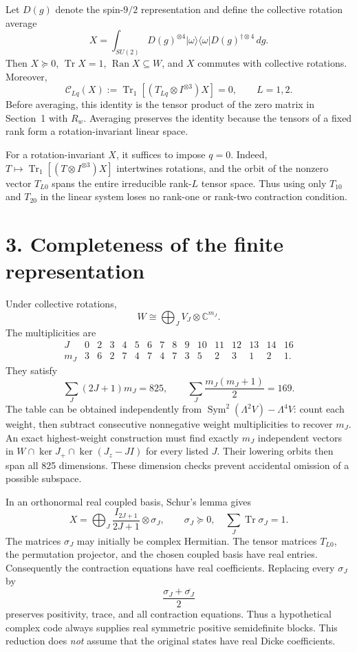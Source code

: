 \documentclass[11pt]{article}
\newcommand{\Tr}{\operatorname{Tr}}
\newcommand{\Sym}{\operatorname{Sym}}
\newcommand{\Ran}{\operatorname{Ran}}
\begin{document}
Let $D(g)$ denote the spin-$9/2$ representation and define the collective rotation average
\[
 X=\int_{SU(2)}D(g)^{\otimes4}|\omega\rangle\langle\omega|
                      D(g)^{\dagger\otimes4}\,dg.
\]
Then $X\succeq0$, $\Tr X=1$, $\Ran X\subseteq W$, and $X$ commutes with collective rotations. Moreover,
\[
 \mathcal C_{Lq}(X):=
 \Tr_1[(T_{Lq}\otimes I^{\otimes3})X]=0,
 \qquad L=1,2.
\]
Before averaging, this identity is the tensor product of the zero matrix in Section~1 with $R_w$. Averaging preserves the identity because the tensors of a fixed rank form a rotation-invariant linear space.

For a rotation-invariant $X$, it suffices to impose $q=0$. Indeed,
$T\mapsto\Tr_1[(T\otimes I^{\otimes3})X]$ intertwines rotations, and the orbit of the nonzero vector $T_{L0}$ spans the entire irreducible rank-$L$ tensor space. Thus using only $T_{10}$ and $T_{20}$ in the linear system loses no rank-one or rank-two contraction condition.

\section*{3. Completeness of the finite representation}
Under collective rotations,
\[
 W\cong\bigoplus_J V_J\otimes\mathbb C^{m_J}.
\]
The multiplicities are
\[
\begin{array}{c|rrrrrrrrrrrrrrr}
J&0&2&3&4&5&6&7&8&9&10&11&12&13&14&16\\\hline
m_J&3&6&2&7&4&7&4&7&3&5&2&3&1&2&1.
\end{array}
\]
They satisfy
\[
 \sum_J(2J+1)m_J=825,
 \qquad \sum_J\frac{m_J(m_J+1)}2=169.
\]
The table can be obtained independently from
$\Sym^2(\Lambda^2V)-\Lambda^4V$: count each weight, then subtract consecutive nonnegative weight multiplicities to recover $m_J$. An exact highest-weight construction must find exactly $m_J$ independent vectors in
$W\cap\ker J_+\cap\ker(J_z-JI)$ for every listed $J$. Their lowering orbits then span all 825 dimensions. These dimension checks prevent accidental omission of a possible subspace.

In an orthonormal real coupled basis, Schur's lemma gives
\[
 X=\bigoplus_J\frac{I_{2J+1}}{2J+1}\otimes\sigma_J,
 \qquad \sigma_J\succeq0,\quad\sum_J\Tr\sigma_J=1.
\]
The matrices $\sigma_J$ may initially be complex Hermitian. The tensor matrices $T_{L0}$, the permutation projector, and the chosen coupled basis have real entries. Consequently the contraction equations have real coefficients. Replacing every $\sigma_J$ by
\[
 \frac{\sigma_J+\overline{\sigma_J}}2
\]
preserves positivity, trace, and all contraction equations. Thus a hypothetical complex code always supplies real symmetric positive semidefinite blocks. This reduction does \emph{not} assume that the original states have real Dicke coefficients.
\end{document}
